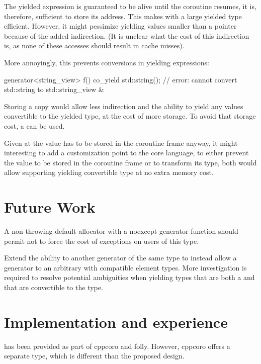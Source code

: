\documentclass{wg21}
\begin{document}
The yielded expression is guaranteed to be alive until the coroutine resumes, it is, therefore, sufficient to store
its address. 
This makes  with a large yielded type efficient.
However, it might pessimize yielding values smaller than a pointer because of the added indirection.
(It is unclear what the cost of this indirection is, as none of these accesses should result in cache misses).

More annoyingly, this prevents conversions in yielding expressions:

\begin{colorblock}
generator<string_view> f() {
    co_yield std::string(); // error: cannot convert std::string to std::string_view \&
}
\end{colorblock}

Storing a copy would allow less indirection and the ability to yield any values convertible to the yielded type,
at the cost of more storage.
To avoid that storage cost, a  can be used.

Given at the value has to be stored in the coroutine frame anyway, it might interesting to add a 
 customization point to the core language, to either prevent the value to be stored in the coroutine frame or to
transform its type, both would allow supporting yielding convertible type at no extra memory cost.  

\section{Future Work}

A non-throwing default allocator with a noexcept generator function should
permit not to force the cost of exceptions on users of this type.  

Extend the ability to  another generator of the same type to instead
allow a generator to  an arbitrary  with compatible
element types. More investigation is required to resolve potential ambiguities
when yielding types that are both a  and that are convertible to the
 type.

\section{Implementation and experience}

 has been provided as part of cppcoro and folly.
However, cppcoro offers a separate  type, which is different than the proposed design.
\end{document}
